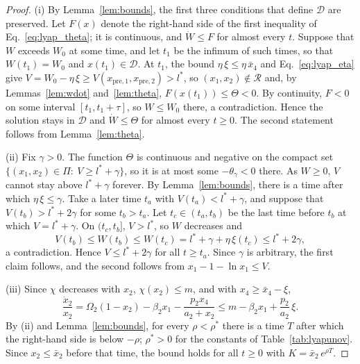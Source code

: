 \begin{proof}
(i) By Lemma~\ref{lem:bounds}, the first three conditions that define $\mathcal D$ are preserved. Let $F(x)$ denote the right-hand side of the first inequality of Eq.~\eqref{eq:lyap_theta}; it is continuous, and $\dot W\le F$ for almost every $t$. Suppose that $W$ exceeds $W_0$ at some time, and let $t_1$ be the infimum of such times, so that $W(t_1)=W_0$ and $x(t_1)\in\mathcal D$. At $t_1$, the bound $\eta\,\xi\le\eta\,\bar x_4$ and Eq.~\eqref{eq:lyap_eta} give $V=W_0-\eta\,\xi\ge V(x_{\mathrm{pre},1},x_{\mathrm{pre},2})>l^\ast$, so $(x_1,x_2)\notin\mathcal R$ and, by Lemmas~\ref{lem:wdot} and~\ref{lem:theta}, $F(x(t_1))\le\Theta<0$. By continuity, $F<0$ on some interval $[t_1,t_1+\tau]$, so $W\le W_0$ there, a contradiction. Hence the solution stays in $\mathcal D$ and $\dot W\le\Theta$ for almost every $t\ge0$. The second statement follows from Lemma~\ref{lem:theta}.

(ii) Fix $\gamma>0$. The function $\Theta$ is continuous and negative on the compact set $\{(x_1,x_2)\in\Pi:\ V\ge l^\ast+\gamma\}$, so it is at most some $-\theta_\gamma<0$ there. As $W\ge0$, $V$ cannot stay above $l^\ast+\gamma$ forever. By Lemma~\ref{lem:bounds}, there is a time after which $\eta\,\xi\le\gamma$. Take a later time $t_a$ with $V(t_a)<l^\ast+\gamma$, and suppose that $V(t_b)>l^\ast+2\gamma$ for some $t_b>t_a$. Let $t_c\in(t_a,t_b)$ be the last time before $t_b$ at which $V=l^\ast+\gamma$. On $(t_c,t_b]$, $V>l^\ast$, so $W$ decreases and
\[
V(t_b)\le W(t_b)\le W(t_c)=l^\ast+\gamma+\eta\,\xi(t_c)\le l^\ast+2\gamma ,
\]
a contradiction. Hence $V\le l^\ast+2\gamma$ for all $t\ge t_a$. Since $\gamma$ is arbitrary, the first claim follows, and the second follows from $x_1-1-\ln x_1\le V$.

(iii) Since $\chi$ decreases with $x_2$, $\chi(x_2)\le m$, and with $x_4\ge\bar x_4-\xi$,
\[
\frac{\dot x_2}{x_2}=\Omega_2(1-x_2)-\beta_2x_1-\frac{p_2x_4}{a_2+x_2}\le m-\beta_2x_1+\frac{p_2}{a_2}\,\xi .
\]
By (ii) and Lemma~\ref{lem:bounds}, for every $\rho<\rho^\ast$ there is a time $T$ after which the right-hand side is below $-\rho$; $\rho^\ast>0$ for the constants of Table~\ref{tab:lyapunov}. Since $x_2\le\bar x_2$ before that time, the bound holds for all $t\ge0$ with $K=\bar x_2\,e^{\rho T}$.
\end{proof}

